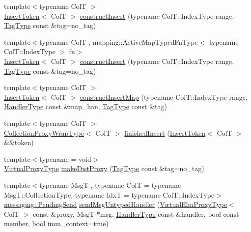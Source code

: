 \begin{DoxyCompactItemize}
\item 
{\footnotesize template$<$typename ColT $>$ }\\\hyperlink{structvt_1_1vrt_1_1collection_1_1_insert_token}{Insert\+Token}$<$ ColT $>$ \hyperlink{structvt_1_1vrt_1_1collection_1_1_collection_manager_a0e15cc861c0d979d8977b226efd7c271}{construct\+Insert} (typename Col\+T\+::\+Index\+Type range, \hyperlink{namespacevt_a84ab281dae04a52a4b243d6bf62d0e52}{Tag\+Type} const \&tag=no\+\_\+tag)
\item 
{\footnotesize template$<$typename ColT , mapping\+::\+Active\+Map\+Typed\+Fn\+Type$<$ typename Col\+T\+::\+Index\+Type $>$ fn$>$ }\\\hyperlink{structvt_1_1vrt_1_1collection_1_1_insert_token}{Insert\+Token}$<$ ColT $>$ \hyperlink{structvt_1_1vrt_1_1collection_1_1_collection_manager_a51e938c8c05bf9a39ab69532ea12336d}{construct\+Insert} (typename Col\+T\+::\+Index\+Type range, \hyperlink{namespacevt_a84ab281dae04a52a4b243d6bf62d0e52}{Tag\+Type} const \&tag=no\+\_\+tag)
\item 
{\footnotesize template$<$typename ColT $>$ }\\\hyperlink{structvt_1_1vrt_1_1collection_1_1_insert_token}{Insert\+Token}$<$ ColT $>$ \hyperlink{structvt_1_1vrt_1_1collection_1_1_collection_manager_a5fdc620b8c03bf7748802e35cff1afe9}{construct\+Insert\+Map} (typename Col\+T\+::\+Index\+Type range, \hyperlink{namespacevt_af64846b57dfcaf104da3ef6967917573}{Handler\+Type} const \&map\+\_\+han, \hyperlink{namespacevt_a84ab281dae04a52a4b243d6bf62d0e52}{Tag\+Type} const \&tag)
\item 
{\footnotesize template$<$typename ColT $>$ }\\\hyperlink{structvt_1_1vrt_1_1collection_1_1_collection_manager_a56458ed7f9bb22b631b9b3a745f42f94}{Collection\+Proxy\+Wrap\+Type}$<$ ColT $>$ \hyperlink{structvt_1_1vrt_1_1collection_1_1_collection_manager_a9275a4f6a7c33389813ba7fe4cc75d7e}{finished\+Insert} (\hyperlink{structvt_1_1vrt_1_1collection_1_1_insert_token}{Insert\+Token}$<$ ColT $>$ \&\&token)
\item 
{\footnotesize template$<$typename  = void$>$ }\\\hyperlink{namespacevt_a1b417dd5d684f045bb58a0ede70045ac}{Virtual\+Proxy\+Type} \hyperlink{structvt_1_1vrt_1_1collection_1_1_collection_manager_a1f18abc7b511cce4d07ba011c91d21df}{make\+Dist\+Proxy} (\hyperlink{namespacevt_a84ab281dae04a52a4b243d6bf62d0e52}{Tag\+Type} const \&tag=no\+\_\+tag)
\item 
{\footnotesize template$<$typename MsgT , typename ColT  = typename Msg\+T\+::\+Collection\+Type, typename IdxT  = typename Col\+T\+::\+Index\+Type$>$ }\\\hyperlink{structvt_1_1messaging_1_1_pending_send}{messaging\+::\+Pending\+Send} \hyperlink{structvt_1_1vrt_1_1collection_1_1_collection_manager_a26df5d55e8992f2d2a2752f61cc26d23}{send\+Msg\+Untyped\+Handler} (\hyperlink{namespacevt_1_1vrt_a620a5c8c59d13e513f690c74b4af516f}{Virtual\+Elm\+Proxy\+Type}$<$ ColT $>$ const \&proxy, MsgT $\ast$msg, \hyperlink{namespacevt_af64846b57dfcaf104da3ef6967917573}{Handler\+Type} const \&handler, bool const member, bool imm\+\_\+context=true)

\end{DoxyCompactItemize}
